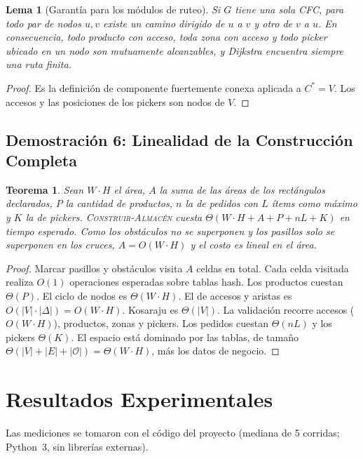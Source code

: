 \documentclass[11pt,a4paper]{article}
\newtheorem{teorema}{Teorema}
\newtheorem{lema}{Lema}
\theoremstyle{definition}
\begin{document}
\begin{lema}[Garantía para los módulos de ruteo]
Si $G$ tiene una sola CFC, para todo par de nodos $u,v$ existe un camino dirigido de $u$ a $v$ y otro de $v$ a $u$. En consecuencia, todo producto con acceso, toda zona con acceso y todo picker ubicado en un nodo son mutuamente alcanzables, y Dijkstra encuentra siempre una ruta finita.
\end{lema}
\begin{proof}
Es la definición de componente fuertemente conexa aplicada a $C^\ast=V$. Los accesos y las posiciones de los pickers son nodos de $V$.
\end{proof}

\subsection{Demostración 6: Linealidad de la Construcción Completa}

\begin{teorema}
Sean $W\cdot H$ el área, $A$ la suma de las áreas de los rectángulos declarados, $P$ la cantidad de productos, $n$ la de pedidos con $L$ ítems como máximo y $K$ la de pickers. \textsc{Construir-Almacén} cuesta $\Theta(W\cdot H+A+P+nL+K)$ en tiempo esperado. Como los obstáculos no se superponen y los pasillos solo se superponen en los cruces, $A=O(W\cdot H)$ y el costo es lineal en el área.
\end{teorema}
\begin{proof}
Marcar pasillos y obstáculos visita $A$ celdas en total. Cada celda visitada realiza $O(1)$ operaciones esperadas sobre tablas hash. Los productos cuestan $\Theta(P)$. El ciclo de nodos es $\Theta(W\cdot H)$. El de accesos y aristas es $O(|V|\cdot|\Delta|)=O(W\cdot H)$. Kosaraju es $\Theta(|V|)$. La validación recorre accesos ($O(W\cdot H)$), productos, zonas y pickers. Los pedidos cuestan $\Theta(nL)$ y los pickers $\Theta(K)$. El espacio está dominado por las tablas, de tamaño $\Theta(|V|+|E|+|\mathcal{O}|)=\Theta(W\cdot H)$, más los datos de negocio.
\end{proof}

\section{Resultados Experimentales}

Las mediciones se tomaron con el código del proyecto (mediana de 5 corridas; Python~3, sin librerías externas).
\end{document}
